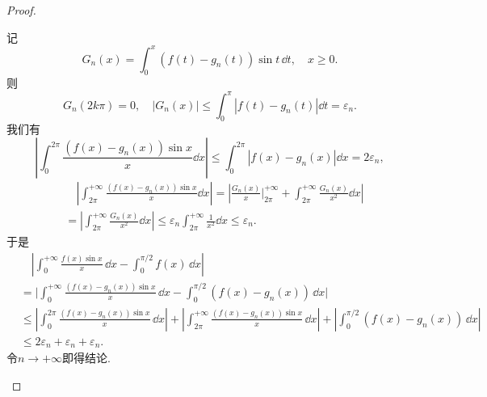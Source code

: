 \begin{a}
\begin{enumerate}
\begin{proof}
\begin{enumerate}[label=(\roman*)]
记\[G_n(x)=\int_{0}^{x}\left(f(t)-g_n(t)\right)\sin t\,\dd t,\quad x\geqslant 0.\]则
\[G_n(2k\pi)=0,\quad\left|G_n(x)\right|\leqslant\int_{0}^{\pi}\left|f(t)-g_n(t)\right|\dd t=\varepsilon_n.\]
我们有\[\left|\int_{0}^{2\pi}\frac{\left(f(x)-g_n(x)\right)\sin x}{x}\dd x\right|
\leqslant\int_{0}^{2\pi}\left|f(x)-g_n(x)\right|\dd x=2\varepsilon_n,\]
\[\begin{split}
&\quad\left|\int_{2\pi}^{+\infty}\frac{\left(f(x)-g_n(x)\right)\sin x}{x}\dd x\right|
=\left|\frac{G_n(x)}{x}\Big|_{2\pi}^{+\infty}+\int_{2\pi}^{+\infty}\frac{G_n(x)}{x^2}\dd x\right|\\
&=\left|\int_{2\pi}^{+\infty}\frac{G_n(x)}{x^2}\dd x\right|
\leqslant\varepsilon_n\int_{2\pi}^{+\infty}\frac{1}{x^2}\dd x\leqslant \varepsilon_n.
\end{split}\]
于是\[\begin{split}
&\quad\left|\int_{0}^{+\infty}\frac{f(x)\sin x}{x}\,\dd x-\int_{0}^{\pi/2}f(x)\,\dd x\right|\\
&=\bigg|\int_{0}^{+\infty}\frac{(f(x)-g_n(x))\sin x}{x}\,\dd x-\int_{0}^{\pi/2}(f(x)-g_n(x))\,\dd x\bigg|\\
&\leqslant\left|\int_{0}^{2\pi}\frac{\left(f(x)-g_n(x)\right)\sin x}{x}\,\dd x\right|
+\left|\int_{2\pi}^{+\infty}\frac{\left(f(x)-g_n(x)\right)\sin x}{x}\,\dd x\right|
+\left|\int_{0}^{\pi/2}\left(f(x)-g_n(x)\right)\,\dd x\right|\\
&\leqslant2\varepsilon_n+\varepsilon_n+\varepsilon_n.
\end{split}\]令\(n\rightarrow+\infty\)即得结论.
\end{enumerate}


\end{proof}
\end{enumerate}
\end{a}
